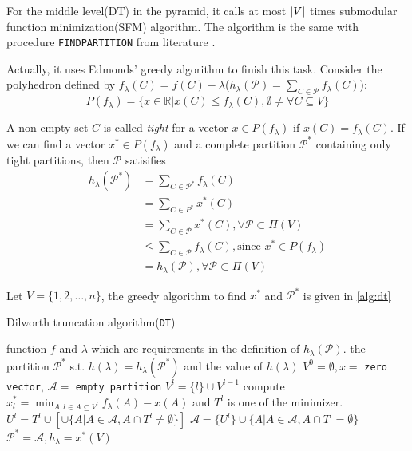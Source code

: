\documentclass{article}
\def\R{\mathbb{R}}
\def\P{\mathcal{P}}
\DeclarePairedDelimiter\abs{\lvert}{\rvert}
\theoremstyle{definition}
\begin{document}
For the middle level(DT) in the pyramid, it calls at most $\abs{V}$ times submodular function minimization(SFM) algorithm.
The algorithm is the same with procedure \texttt{FINDPARTITION} from literature \cite{mac}.

Actually, it uses Edmonds' greedy algorithm to finish this task. Consider the polyhedron defined by $f_{\lambda}(C) = f(C)-\lambda$($h_{\lambda}(\P)= \sum_{C \in \P} f_{\lambda}(C)$):
\begin{equation}
P(f_{\lambda}) = \{ x \in \R |  x(C) \leq f_{\lambda}(C), \emptyset \neq \forall C \subseteq V\}
\end{equation}

A non-empty set $C$ is called \textit{tight} for a vector $x \in P(f_{\lambda})$ if $x(C) = f_{\lambda}(C)$.
If we can find a vector $ x^* \in P(f_{\lambda}) $ and a complete partition $\P^*$ containing only tight partitions,
then $\P$ satisifies
\begin{align*}
h_{\lambda}(\P^*) &= \sum_{C \in \P^*} f_{\lambda}(C) \\
 &=\sum_{C\in P^*} x^*(C)  \\
& = \sum_{C \in \P} x^*(C), \forall \P \subset \Pi(V) \\
& \leq \sum_{C\in \P} f_{\lambda}(C), \textrm{since } x^* \in P(f_{\lambda}) \\
& = h_{\lambda}(\P),\forall \P \subset \Pi(V) 
\end{align*}

Let $V=\{1, 2, \dots, n\}$, the greedy algorithm to find $x^*$ and $\P^*$ is given in \ref{alg:dt}
\begin{algorithm}
\caption{Dilworth truncation algorithm(\texttt{DT})}\label{alg:dt}
\begin{algorithmic}[1]
\REQUIRE function $f$ and $\lambda$ which are requirements in the definition of $h_{\lambda}(\P)$.
\ENSURE the partition $\P^*$ s.t. $h(\lambda) = h_{\lambda}(\P^*)$ and the value of $h(\lambda)$
\STATE $V^0 = \emptyset, x = $ \texttt{zero vector}, $\mathcal{A} = $ \texttt{empty partition} 
\STATE $V^l = \{l\} \cup V^{l-1}$
\STATE\label{alg:tight} compute $x^*_l = \displaystyle\min_{ A: l \in A \subseteq V^l} f_{\lambda}(A)- x(A)$ and $T^l$ is one of the minimizer.
\STATE $U^l = T^l \cup [\cup \{A | A \in \mathcal{A}, A \cap T^l \neq \emptyset\}] $
\STATE $\mathcal{A} = \{U^l\} \cup \{A | A \in \mathcal{A}, A \cap T^l = \emptyset \}$
\ENDFOR
\STATE $\P^* = \mathcal{A}, h_{\lambda} = x^*(V)$
\end{algorithmic}
\end{algorithm}
\end{document}

